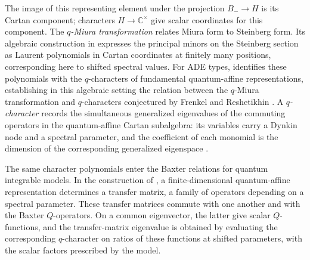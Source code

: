 \documentclass[11pt,leqno]{amsart}
\numberwithin{equation}{section}
\theoremstyle{plain}
\theoremstyle{definition}
\theoremstyle{plain}
\theoremstyle{definition}
\theoremstyle{remark}
\begin{document}
The image of this representing element under the projection $B_-\to H$ is its Cartan component; characters $H\to\mathbb C^\times$ give scalar coordinates for this component.  The \emph{$q$-Miura transformation} relates Miura form to Steinberg form.  Its algebraic construction in \cite{FL2025} expresses the principal minors on the Steinberg section as Laurent polynomials in Cartan coordinates at finitely many positions, corresponding here to shifted spectral values.  For ADE types, \cite{FL2025} identifies these polynomials with the $q$-characters of fundamental quantum-affine representations, establishing in this algebraic setting the relation between the $q$-Miura transformation and $q$-characters conjectured by Frenkel and Reshetikhin \cite{FR1998}.  A \emph{$q$-character} records the simultaneous generalized eigenvalues of the commuting operators in the quantum-affine Cartan subalgebra: its variables carry a Dynkin node and a spectral parameter, and the coefficient of each monomial is the dimension of the corresponding generalized eigenspace \cite{FR1998}.

The same character polynomials enter the Baxter relations for quantum integrable models.  In the construction of \cite{FH2015}, a finite-dimensional quantum-affine representation determines a transfer matrix, a family of operators depending on a spectral parameter.  These transfer matrices commute with one another and with the Baxter $Q$-operators.  On a common eigenvector, the latter give scalar $Q$-functions, and the transfer-matrix eigenvalue is obtained by evaluating the corresponding $q$-character on ratios of these functions at shifted parameters, with the scalar factors prescribed by the model.
\end{document}
